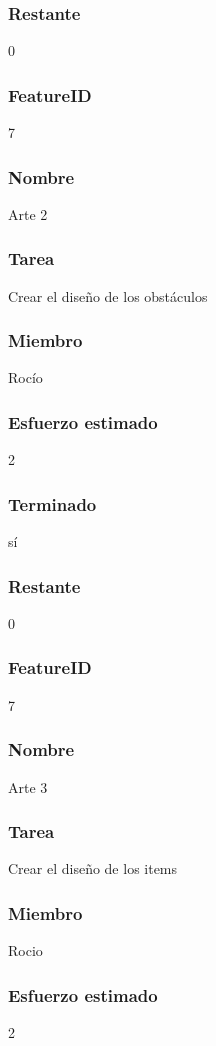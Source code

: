 \subsubsection{Restante} 0



\subsubsection{FeatureID} 7
\subsubsection{Nombre} Arte 2
\subsubsection{Tarea} Crear el diseño de los obstáculos
\subsubsection{Miembro} Rocío
\subsubsection{Esfuerzo estimado} 2
\subsubsection{Terminado} sí
\subsubsection{Restante} 0


\subsubsection{FeatureID} 7
\subsubsection{Nombre} Arte 3
\subsubsection{Tarea} Crear el diseño de los items
\subsubsection{Miembro} Rocio
\subsubsection{Esfuerzo estimado} 2

